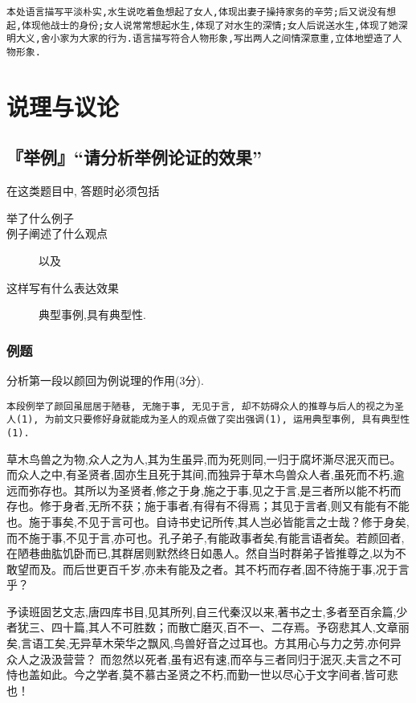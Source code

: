 \documentclass{ctexart}
\newcommand{\nm}{\normalsize}
\begin{document}
\texttt{本处语言描写平淡朴实,水生说吃着鱼想起了女人,体现出妻子操持家务的辛劳;后又说没有想起,体现他战士的身份;女人说常常想起水生,体现了对水生的深情;女人后说送水生,体现了她深明大义,舍小家为大家的行为.语言描写符合人物形象,写出两人之间情深意重,立体地塑造了人物形象.}

\clearpage

\section{说理与议论}

\subsection{『举例』``请分析举例论证的效果''}

在这类题目中, 答题时必须包括

\begin{description}
	\item[举了什么例子]
	\item[例子阐述了什么观点] 以及
	\item[这样写有什么表达效果] 典型事例,具有典型性.
\end{description}

\subsubsection{例题}
\large \songti

分析第一段以颜回为例说理的作用(3分).

\texttt{本段例举了颜回虽屈居于陋巷, 无施于事, 无见于言, 却不妨碍众人的推尊与后人的视之为圣人(1), 为前文只要修好身就能成为圣人的观点做了突出强调(1), 运用典型事例, 具有典型性(1).}

\nm \fangsong

草木鸟兽之为物,众人之为人,其为生虽异,而为死则同,一归于腐坏澌尽泯灭而已。而众人之中,有圣贤者,固亦生且死于其间,而独异于草木鸟兽众人者,虽死而不朽,逾远而弥存也。其所以为圣贤者,修之于身,施之于事,见之于言,是三者所以能不朽而存也。修于身者,无所不获；施于事者,有得有不得焉；其见于言者,则又有能有不能也。施于事矣,不见于言可也。自诗书史记所传,其人岂必皆能言之士哉？修于身矣,而不施于事,不见于言,亦可也。孔子弟子,有能政事者矣,有能言语者矣。若颜回者,在陋巷曲肱饥卧而已,其群居则默然终日如愚人。然自当时群弟子皆推尊之,以为不敢望而及。而后世更百千岁,亦未有能及之者。其不朽而存者,固不待施于事,况于言乎？

予读班固艺文志,唐四库书目,见其所列,自三代秦汉以来,著书之士,多者至百余篇,少者犹三、四十篇,其人不可胜数；而散亡磨灭,百不一、二存焉。予窃悲其人,文章丽矣,言语工矣,无异草木荣华之飘风,鸟兽好音之过耳也。方其用心与力之劳,亦何异众人之汲汲营营？ 而忽然以死者,虽有迟有速,而卒与三者同归于泯灭,夫言之不可恃也盖如此。今之学者,莫不慕古圣贤之不朽,而勤一世以尽心于文字间者,皆可悲也！
\end{document}
